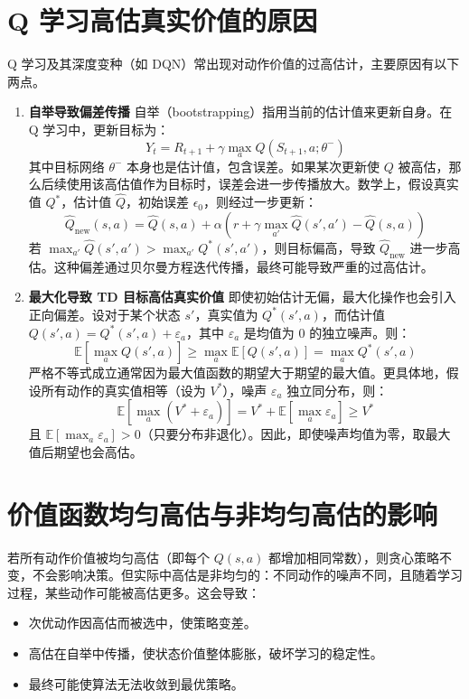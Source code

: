 \documentclass{article}
\begin{document}
\section{Q 学习高估真实价值的原因}
Q 学习及其深度变种（如 DQN）常出现对动作价值的过高估计，主要原因有以下两点。
\begin{enumerate}
\item\textbf{自举导致偏差传播}
自举（bootstrapping）指用当前的估计值来更新自身。在 Q 学习中，更新目标为：
\[
Y_t = R_{t+1} + \gamma \max_{a} Q(S_{t+1}, a; \theta^-)
\tag{16}
\]
其中目标网络 \(\theta^-\) 本身也是估计值，包含误差。如果某次更新使 \(Q\) 被高估，那么后续使用该高估值作为目标时，误差会进一步传播放大。数学上，假设真实值 \(Q^*\)，估计值 \(\hat{Q}\)，初始误差 \(\epsilon_0\)，则经过一步更新：
\[
\hat{Q}_{\text{new}}(s,a) = \hat{Q}(s,a) + \alpha \left( r + \gamma \max_{a'} \hat{Q}(s',a') - \hat{Q}(s,a) \right)
\tag{17}
\]
若 \(\max_{a'} \hat{Q}(s',a') > \max_{a'} Q^*(s',a')\)，则目标偏高，导致 \(\hat{Q}_{\text{new}}\) 进一步高估。这种偏差通过贝尔曼方程迭代传播，最终可能导致严重的过高估计。

\item\textbf{最大化导致 TD 目标高估真实价值}
即使初始估计无偏，最大化操作也会引入正向偏差。设对于某个状态 \(s'\)，真实值为 \(Q^*(s',a)\)，而估计值 \(Q(s',a) = Q^*(s',a) + \varepsilon_a\)，其中 \(\varepsilon_a\) 是均值为 0 的独立噪声。则：
\[
\mathbb{E}\left[ \max_a Q(s',a) \right] \geq \max_a \mathbb{E}[Q(s',a)] = \max_a Q^*(s',a)
\tag{18}
\]
严格不等式成立通常因为最大值函数的期望大于期望的最大值。更具体地，假设所有动作的真实值相等（设为 \(V^*\)），噪声 \(\varepsilon_a\) 独立同分布，则：
\[
\mathbb{E}\left[ \max_a (V^* + \varepsilon_a) \right] = V^* + \mathbb{E}[\max_a \varepsilon_a] \geq V^*
\tag{19}
\]
且 \(\mathbb{E}[\max_a \varepsilon_a] > 0\)（只要分布非退化）。因此，即使噪声均值为零，取最大值后期望也会高估。
\end{enumerate}

\section{价值函数均匀高估与非均匀高估的影响}
若所有动作价值被均匀高估（即每个 \(Q(s,a)\) 都增加相同常数），则贪心策略不变，不会影响决策。但实际中高估是非均匀的：不同动作的噪声不同，且随着学习过程，某些动作可能被高估更多。这会导致：
\begin{itemize}
    \item 次优动作因高估而被选中，使策略变差。
    \item 高估在自举中传播，使状态价值整体膨胀，破坏学习的稳定性。
    \item 最终可能使算法无法收敛到最优策略。
\end{itemize}
\end{document}
